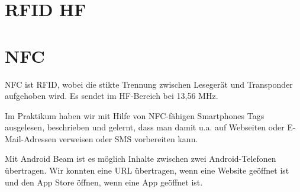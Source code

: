 \documentclass[paper=a4,fontsize=11pt,headsepline,footsepline,parskip=half]{scrartcl}
\begin{document}
\section{RFID HF}

\section{NFC}

NFC ist RFID, wobei die stikte Trennung zwischen Lesegerät und Transponder aufgehoben wird. Es sendet im HF-Bereich bei 13,56 MHz.

Im Praktikum haben wir mit Hilfe von NFC-fähigen Smartphones Tags ausgelesen, beschrieben und gelernt, dass man damit u.a.
auf Webseiten oder E-Mail-Adressen verweisen oder SMS vorbereiten kann.


Mit Android Beam ist es möglich Inhalte zwischen zwei Android-Telefonen übertragen.
Wir konnten eine URL übertragen, wenn eine Website geöffnet ist und den App Store
öffnen, wenn eine App geöffnet ist.
\end{document}
